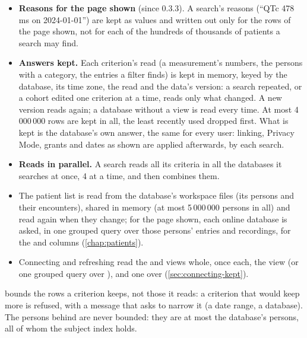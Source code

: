 \begin{itemize}
  database's time zone, two days wider on each side (a time with an offset, dates as shown in
  Privacy Mode). Only times written as ISO 8601 text () are compared
  there; a time written as a number, or as text of another form, is read whatever its date.
  Medorama tests the dates of every row read exactly, so the patients found are the same. A
  PostgreSQL database is asked without the dates, and every value of the name is read.
\item \textbf{Reasons for the page shown} (since 0.3.3). A search's reasons (``QTc 478 ms on
  2024-01-01'') are kept as values and written out only for the rows of the page shown, not for
  each of the hundreds of thousands of patients a search may find.
\item \textbf{Answers kept.} Each criterion's read (a measurement's numbers, the persons with a
  category, the entries a filter finds) is kept in memory, keyed by the database, its time zone,
  the read and the data's version: a search repeated, or a cohort edited one criterion at a time,
  reads only what changed. A new version reads again; a database without a  view
  is read every time. At most 4\,000\,000 rows are kept in all, the least recently used dropped
  first. What is kept is the database's own answer, the same for every user: linking, Privacy
  Mode, grants and dates as shown are applied afterwards, by each search.
\item \textbf{Reads in parallel.} A search reads all its criteria in all the databases it
  searches at once, 4 at a time, and then combines them.
\item The patient list is read from the database's workspace files (its persons and their
  encounters), shared in memory (at most 5\,000\,000 persons in all) and read again when they
  change; for the page shown, each online database is asked, in one grouped query over those
  persons' entries and recordings, for the  and  columns
  (\cref{chap:patients}).
\item Connecting and refreshing read the  and  views whole, once
  each, the  view (or one grouped query over ), and one
   over  (\cref{sec:connecting-kept}).
\end{itemize}
 bounds the rows a criterion keeps, not those it reads: a criterion that would
keep more is refused, with a message that asks to narrow it (a date range, a database). The
persons behind  are never bounded: they are at most the database's persons, all
of whom the subject index holds.

